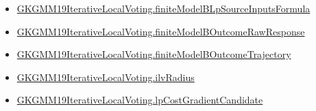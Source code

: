 \documentclass[10pt]{article}
\begin{document}
\begin{itemize}
\item \hyperlink{governing-declaration-7910c34249d682bd}{GKGMM19\allowbreak{}Iterative\allowbreak{}Local\allowbreak{}Voting.\allowbreak{}finite\allowbreak{}Model\allowbreak{}B\allowbreak{}Lp\allowbreak{}Source\allowbreak{}Inputs\allowbreak{}Formula}
\item \hyperlink{governing-declaration-82ace23264ae173e}{GKGMM19\allowbreak{}Iterative\allowbreak{}Local\allowbreak{}Voting.\allowbreak{}finite\allowbreak{}Model\allowbreak{}B\allowbreak{}Outcome\allowbreak{}Raw\allowbreak{}Response}
\item \hyperlink{governing-declaration-afdf8d45bd28d786}{GKGMM19\allowbreak{}Iterative\allowbreak{}Local\allowbreak{}Voting.\allowbreak{}finite\allowbreak{}Model\allowbreak{}B\allowbreak{}Outcome\allowbreak{}Trajectory}
\item \hyperlink{governing-declaration-2cfd8c76662024e1}{GKGMM19\allowbreak{}Iterative\allowbreak{}Local\allowbreak{}Voting.\allowbreak{}ilv\allowbreak{}Radius}
\item \hyperlink{governing-declaration-bce3799389f4457e}{GKGMM19\allowbreak{}Iterative\allowbreak{}Local\allowbreak{}Voting.\allowbreak{}lp\allowbreak{}Cost\allowbreak{}Gradient\allowbreak{}Candidate}
\end{itemize}
\end{document}
